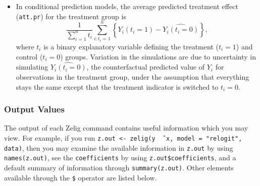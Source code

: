\begin{itemize}
\item In conditional prediction models, the average predicted treatment
  effect ({\tt att.pr}) for the treatment group is 
    \begin{equation*} \frac{1}{\sum_{i=1}^n t_i}\sum_{i:t_i=1}^n \left\{ Y_i(t_i=1) -
      \widehat{Y_i(t_i=0)} \right\},
    \end{equation*} 
    where $t_i$ is a binary explanatory variable defining the
    treatment ($t_i=1$) and control ($t_i=0$) groups.  Variation in
    the simulations are due to uncertainty in simulating
    $\widehat{Y_i(t_i=0)}$, the counterfactual predicted value of
    $Y_i$ for observations in the treatment group, under the
    assumption that everything stays the same except that the
    treatment indicator is switched to $t_i=0$.
\end{itemize}

\subsubsection{Output Values}

The output of each Zelig command contains useful information which you
may view.  For example, if you run \texttt{z.out <- zelig(y \~\,
  x, model = "relogit", data)}, then you may examine the available
information in \texttt{z.out} by using \texttt{names(z.out)},
see the {\tt coefficients} by using {\tt z.out\$coefficients}, and
a default summary of information through \texttt{summary(z.out)}.
Other elements available through the {\tt \$} operator are listed
below.

